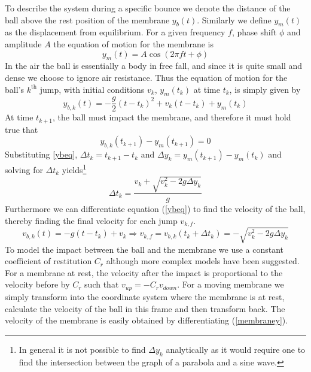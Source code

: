 \documentclass[12pt,oneside,a4paper]{article}
\numberwithin{equation}{section}
\begin{document}
{{{{To describe the system during a specific bounce we denote the distance of the 
ball above the rest position of the membrane $y_b(t)$. Similarly we define 
$y_m(t)$ as the displacement from equilibrium. For a given frequency $f$, phase 
shift $\phi$ and amplitude $A$ the equation of motion for the membrane is
\begin{equation}
	y_m(t)= A \cos(2\pi f t+ \phi)
	\label{membraney}
\end{equation}
In the air the ball is essentially a body in free fall, and since it is quite small and dense we choose to ignore air resistance. Thus the equation of motion for the ball's $k^\text{th}$ jump, with initial conditions $v_k$, $y_m(t_k)$ at time $t_k$, is simply given by
\begin{equation}
	y_{b,k}(t) = -\frac{g}{2}(t-t_k)^2+v_k(t-t_k)+y_m(t_k)
	\label{ybeq}
\end{equation}
At time $t_{k+1}$, the ball must impact the membrane, and therefore it must hold true that
\begin{equation}
	y_{b,k}(t_{k+1})-y_m(t_{k+1})=0
\end{equation}
Substituting \eqref{ybeq}, $\Delta t_k=t_{k+1}-t_k$ and $\Delta y_k=y_m(t_{k+1})-y_m(t_k)$ and solving for $\Delta t_k$ yields\footnote{In general it is not possible to find $\Delta y_k$ analytically as it would require one to find the intersection between the graph of a parabola and a sine wave.}
\begin{equation}
	\Delta t_{k} = \frac{v_{k}+\sqrt{v_k^2-2g\Delta y_k}}{g}
	\label{flytime}
\end{equation}
Furthermore we can differentiate equation (\ref{ybeq}) to find the velocity of the ball, thereby finding the final velocity for each jump $v_{k,f}$.
\begin{equation}
	v_{b,k}(t) = -g(t-t_k)+v_k \Rightarrow v_{k,f} = v_{b,k}(t_k+\Delta t_k) = 
	-\sqrt{v_k^2-2g\Delta y_k}
\end{equation}
To model the impact between the ball and the membrane we use a constant 
coefficient of restitution $C_r$ although more complex models have been 
suggested\cite{muller}. For a membrane at rest, the velocity after the impact 
is proportional to the velocity before by $C_r$ such that $v_{up}=-C_r 
v_{down}$. For a moving membrane we simply transform into the coordinate system 
where the membrane is at rest, calculate the velocity of the ball in this frame 
and then transform back. The velocity of the membrane is easily obtained by 
differentiating (\ref{membraney}).
\begin{equation}

\end{equation}}}}}
\end{document}

